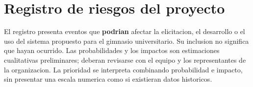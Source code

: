 \section{Registro de riesgos del proyecto}
\label{sec:riesgos}

El registro presenta eventos que \textbf{podrian} afectar la elicitacion, el desarrollo o el uso del sistema propuesto para el gimnasio universitario. Su inclusion no significa que hayan ocurrido. Las probabilidades y los impactos son estimaciones cualitativas preliminares; deberan revisarse con el equipo y los representantes de la organizacion. La prioridad se interpreta combinando probabilidad e impacto, sin presentar una escala numerica como si existieran datos historicos.

